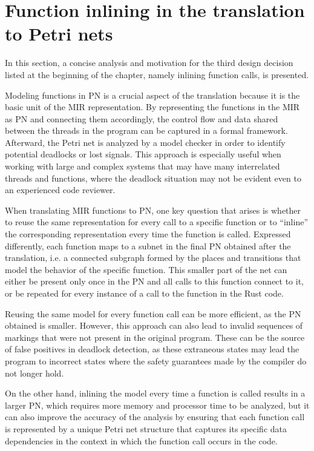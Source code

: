 \documentclass[../Thesis.tex]{subfiles}
\begin{document}
\section{Function inlining in the translation to Petri nets}

In this section, a concise analysis and motivation for the third design decision
listed at the beginning of the chapter, namely inlining function calls, is presented.

Modeling functions in \acrshort{PN} is a crucial aspect of the translation
because it is the basic unit of the MIR representation.
By representing the functions in the MIR as \acrshort{PN} and connecting them accordingly,
the control flow and data shared between the threads in the program
can be captured in a formal framework.
Afterward, the Petri net is analyzed by a model checker
in order to identify potential deadlocks or lost signals.
This approach is especially useful when working with large and complex systems
that may have many interrelated threads and functions,
where the deadlock situation may not be evident even to an experienced code reviewer.

When translating MIR functions to \acrshort{PN}, one key question that arises is
whether to reuse the same representation for every call to a specific function or
to ``inline'' the corresponding representation every time the function is called.
Expressed differently, each function maps to a subnet
in the final \acrshort{PN} obtained after the translation, i.e.
a connected subgraph formed by the places and transitions
that model the behavior of the specific function.
This smaller part of the net can either be present only once in the \acrshort{PN}
and all calls to this function connect to it,
or be repeated for every instance of a call to the function in the Rust code.

Reusing the same model for every function call can be more efficient,
as the \acrshort{PN} obtained is smaller.
However, this approach can also lead to invalid sequences of markings
that were not present in the original program.
These can be the source of false positives in deadlock detection,
as these extraneous states may lead the program to
incorrect states where the safety guarantees made by the compiler do not longer hold.

On the other hand, inlining the model every time a function is called results in
a larger \acrshort{PN}, which requires more memory and processor time to be analyzed,
but it can also improve the accuracy of the analysis by ensuring
that each function call is represented by a unique Petri net structure
that captures its specific data dependencies in the context
in which the function call occurs in the code.
\end{document}
